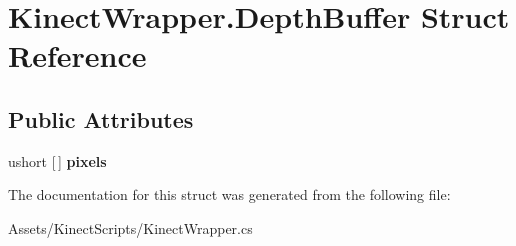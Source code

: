 \hypertarget{struct_kinect_wrapper_1_1_depth_buffer}{}\section{Kinect\+Wrapper.\+Depth\+Buffer Struct Reference}
\label{struct_kinect_wrapper_1_1_depth_buffer}
\subsection*{Public Attributes}
\begin{DoxyCompactItemize}
\item 
\mbox{\label{struct_kinect_wrapper_1_1_depth_buffer_ac9b0d6e40149635170949351255fc869}} 
ushort \mbox{[}$\,$\mbox{]} {\bfseries pixels}
\end{DoxyCompactItemize}


The documentation for this struct was generated from the following file\+:\begin{DoxyCompactItemize}
\item 
Assets/\+Kinect\+Scripts/Kinect\+Wrapper.\+cs\end{DoxyCompactItemize}
